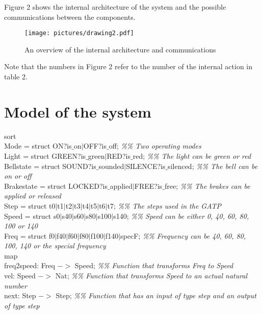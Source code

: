 \documentclass[11pt,a4paper]{article}
\begin{document}
Figure 2 shows the internal architecture of the system and the possible communications between the components. \\


\begin{figure}[h!]
	\centering
	\texttt{[image: pictures/drawing2.pdf]}
	\caption{An overview of the internal architecture and communications}
\end{figure} 

Note that the numbers in Figure 2 refer to the number of the internal action in table 2.



\newpage

\section{Model of the system}



sort \\

	Mode = struct ON?is$\_$on$\mid$OFF?is$\_$off;                             \textit{\%\% Two operating modes}\\
	
	Light = struct GREEN?is$\_$green$\mid$RED?is$\_$red;                      \textit{\%\% The light can be green or red}\\
	
	Bellstate = struct SOUND?is$\_$sounded$\mid$SILENCE?is$\_$silenced;       \textit{\%\% The bell can be on or off}\\
	
	Brakestate = struct LOCKED?is$\_$applied$\mid$FREE?is$\_$free;           \textit{\%\% The brakes can be applied or released} \\  
				
	Step = struct t0$\mid$t1$\mid$t2$\mid$t3$\mid$t4$\mid$t5$\mid$t6$\mid$t7;   \textit{\%\% The steps used in the GATP}\\
	
	Speed = struct s0$\mid$s40$\mid$s60$\mid$s80$\mid$s100$\mid$s140;         \textit{\%\% Speed can be either 0, 40, 60, 80, 100 or 140} \\
	
	Freq = struct  f0$\mid$f40$\mid$f60$\mid$f80$\mid$f100$\mid$f140$\mid$specF;    \textit{\%\% Frequency can be 40, 60, 80, 100, 140 or the special frequency}\\


map \\
	freq2speed: Freq $->$ Speed;                        \textit{\%\% Function that transforms Freq to Speed}\\
	vel: Speed $->$ Nat;                                \textit{\%\% Function that transforms Speed to an actual natural number}   \\
	next: Step $->$ Step;                               \textit{\%\% Function that has an input of type step and an output of type step}\\
\end{document}
